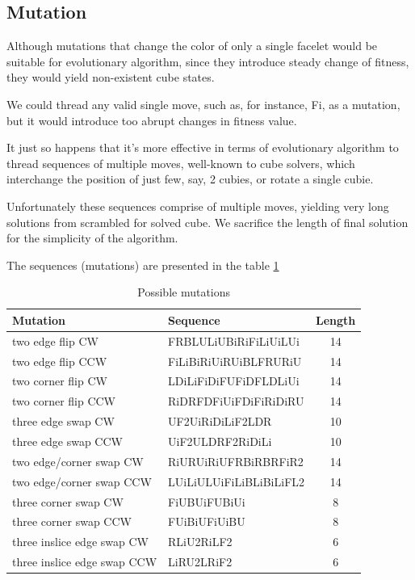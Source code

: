 \documentclass[a4paper]{article}
\begin{document}
\subsection{Mutation}
Although mutations that change the color of only a single facelet would be suitable for evolutionary algorithm, since they introduce steady change of fitness, they would yield non-existent cube states.

We could thread any valid single move, such as, for instance, Fi, as a mutation, but it would introduce too abrupt changes in fitness value.

It just so happens that it’s more effective in terms of evolutionary algorithm to thread sequences of multiple moves, well-known to cube solvers, which interchange the position of just few, say, 2 cubies, or rotate a single cubie.

Unfortunately these sequences comprise of multiple moves, yielding very long solutions from scrambled for solved cube. We sacrifice the length of final solution for the simplicity of the algorithm.

The sequences (mutations) are presented in the table \ref{table:mutations}

\begin{table}[h]
\caption{Possible mutations}
\label{table:mutations}
\begin{tabular}{l|l|c}
\textbf{Mutation} & \textbf{Sequence} & \textbf{Length} \\
\hline
two edge flip CW & FRBLULiUBiRiFiLiUiLUi & 14 \\
\hline
two edge flip CCW & FiLiBiRiUiRUiBLFRURiU & 14 \\
\hline
two corner flip CW & LDiLiFiDiFUFiDFLDLiUi & 14 \\
\hline
two corner flip CCW & RiDRFDFiUiFDiFiRiDiRU & 14 \\
\hline
three edge swap CW & UF2UiRiDiLiF2LDR & 10 \\
\hline
three edge swap CCW & UiF2ULDRF2RiDiLi & 10 \\
\hline
two edge/corner swap CW & RiURUiRiUFRBiRBRFiR2 & 14 \\
\hline
two edge/corner swap CCW & LUiLiULUiFiLiBLiBiLiFL2 & 14 \\
\hline
three corner swap CW & FiUBUiFUBiUi & 8 \\
\hline
three corner swap CCW & FUiBiUFiUiBU & 8 \\
\hline
three inslice edge swap CW & RLiU2RiLF2 & 6 \\
\hline
three inslice edge swap CCW & LiRU2LRiF2 & 6 \\
\end{tabular}
\end{table}
\end{document}
